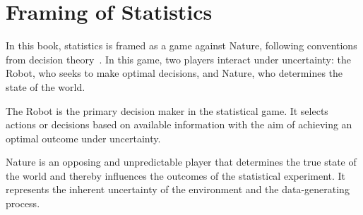 \chapter{Framing of Statistics}
In this book, statistics is framed as a game against Nature, following conventions from decision theory~\cite{lavalle2006planning}. 
In this game, two players interact under uncertainty: the Robot, who seeks to make optimal decisions, and Nature, who determines the state of the world.

\begin{definition}[Robot]
	\label{def:robot}
	The Robot is the primary decision maker in the statistical game.
	It selects actions or decisions based on available information with the aim of achieving an optimal outcome under uncertainty.
\end{definition}

\begin{definition}[Nature]
	\label{def:nature}
	Nature is an opposing and unpredictable player that determines the true state of the world and thereby influences the outcomes of the statistical experiment. It represents the inherent uncertainty of the environment and the data-generating process.
\end{definition}

